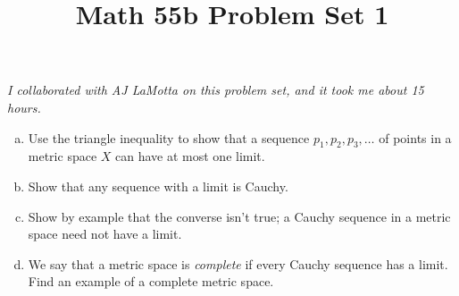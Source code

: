 \documentclass[11pt,letterpaper]{article}
\title{\textbf{Math 55b Problem Set 1}}
\begin{document}
\maketitle

\begin{center}
    \textit{I collaborated with AJ LaMotta on this problem set, and it took me about 15 hours.}
\end{center}

\begin{problem}\noindent
    \begin{enumerate}[(a)]
        \item Use the triangle inequality to show that a sequence $p_1, p_2, p_3, \ldots$ of points in a metric space $X$ can have at most one limit.
        \item Show that any sequence with a limit is Cauchy.
        \item Show by example that the converse isn't true; a Cauchy sequence in a metric space need not have a limit.
        \item We say that a metric space is {\em complete} if every Cauchy sequence has a limit. Find an example of a complete metric space.
    \end{enumerate}
\end{problem}
\end{document}
